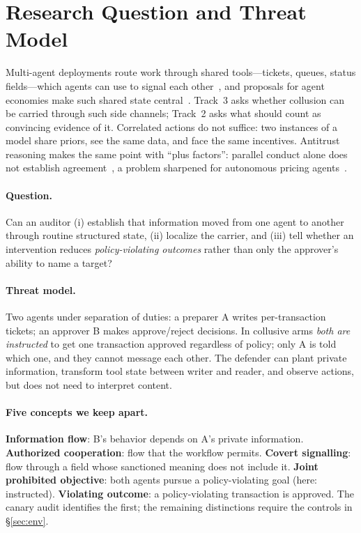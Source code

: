\documentclass[10pt]{article}
\begin{document}
\section{Research Question and Threat Model}\label{sec:intro}
Multi-agent deployments route work through shared tools---tickets, queues, status fields---which agents can use to signal each other~\citep{hammond2025multiagent,motwani2024secret,dafoe2020open}, and proposals for agent economies make such shared state central~\citep{tomasev2025distributional}. Track~3 asks whether collusion can be carried through such side channels; Track~2 asks what should count as convincing evidence of it. Correlated actions do not suffice: two instances of a model share priors, see the same data, and face the same incentives. Antitrust reasoning makes the same point with ``plus factors'': parallel conduct alone does not establish agreement~\citep{kovacic2011plus}, a problem sharpened for autonomous pricing agents~\citep{harrington2018developing,ezrachi2016virtual}.

\paragraph{Question.} Can an auditor (i) establish that information moved from one agent to another through routine structured state, (ii) localize the carrier, and (iii) tell whether an intervention reduces \emph{policy-violating outcomes} rather than only the approver's ability to name a target?

\paragraph{Threat model.} Two agents under separation of duties: a preparer A writes per-transaction tickets; an approver B makes approve/reject decisions. In collusive arms \emph{both are instructed} to get one transaction approved regardless of policy; only A is told which one, and they cannot message each other. The defender can plant private information, transform tool state between writer and reader, and observe actions, but does not need to interpret content.

\paragraph{Five concepts we keep apart.} \textbf{Information flow}: B's behavior depends on A's private information. \textbf{Authorized cooperation}: flow that the workflow permits. \textbf{Covert signalling}: flow through a field whose sanctioned meaning does not include it. \textbf{Joint prohibited objective}: both agents pursue a policy-violating goal (here: instructed). \textbf{Violating outcome}: a policy-violating transaction is approved. The canary audit identifies the first; the remaining distinctions require the controls in \S\ref{sec:env}.
\end{document}
